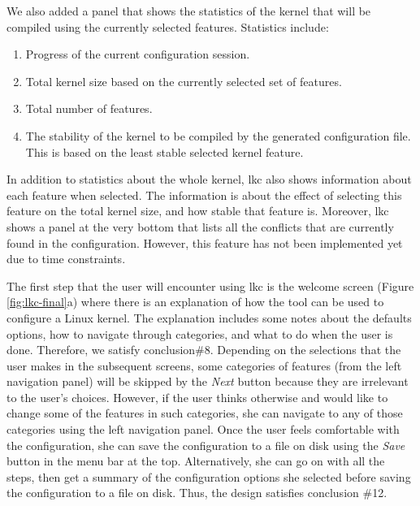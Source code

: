 \documentclass{chi2009}
\begin{document}
We also added a panel that shows the statistics of the kernel that will be compiled using the currently selected features. Statistics include:
\begin{enumerate}
 \item Progress of the current configuration session.
 \item Total kernel size based on the currently selected set of features.
 \item Total number of features.
 \item The stability of the kernel to be compiled by the generated configuration file. This is based on the least stable selected kernel feature.
\end{enumerate}

In addition to statistics about the whole kernel, \textsf{lkc} also shows information about each feature when selected. The information is about the effect
of selecting this feature on the total kernel size, and how stable that feature is. Moreover, \textsf{lkc} shows a panel at the very bottom that lists all the
conflicts that are currently found in the configuration. However, this feature has not been implemented yet due to time constraints.

The first step that the user will encounter using \textsf{lkc} is the welcome screen (Figure \ref{fig:lkc-final}a) where there is an explanation of how the tool
can be used to configure a Linux kernel. The explanation includes some notes about the defaults options, how to navigate through categories, and what to do
when the user is done. Therefore, we satisfy conclusion\#8. Depending on the selections that the user makes in the subsequent screens, some categories of
features (from the left navigation panel) will be skipped by the \textit{Next} button because they are irrelevant to the user's choices. However, if the user
thinks otherwise and would like to change some of the features in such categories, she can navigate to any of those categories using the left navigation panel.
Once the user feels comfortable with the configuration, she can save the configuration to a file on disk using the \textit{Save} button in the menu bar at the
top. Alternatively, she can go on with all the steps, then get a summary of the configuration options she selected before saving the configuration to a file on
disk. Thus, the design satisfies conclusion \#12.
\end{document}
